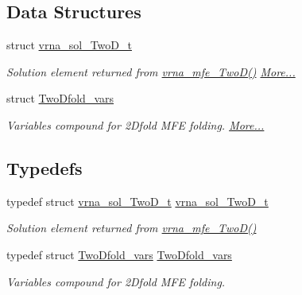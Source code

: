 \subsection*{Data Structures}
\begin{DoxyCompactItemize}
\item 
struct \hyperlink{group__kl__neighborhood__mfe_structvrna__sol__TwoD__t}{vrna\+\_\+sol\+\_\+\+Two\+D\+\_\+t}
\begin{DoxyCompactList}\small\item\em Solution element returned from \hyperlink{group__kl__neighborhood__mfe_ga243c288b463147352829df04de6a2f77}{vrna\+\_\+mfe\+\_\+\+Two\+D()}  \hyperlink{group__kl__neighborhood__mfe_structvrna__sol__TwoD__t}{More...}\end{DoxyCompactList}\item 
struct \hyperlink{group__kl__neighborhood__mfe_structTwoDfold__vars}{Two\+Dfold\+\_\+vars}
\begin{DoxyCompactList}\small\item\em Variables compound for 2\+Dfold M\+FE folding.  \hyperlink{group__kl__neighborhood__mfe_structTwoDfold__vars}{More...}\end{DoxyCompactList}\end{DoxyCompactItemize}
\subsection*{Typedefs}
\begin{DoxyCompactItemize}
\item 
typedef struct \hyperlink{group__kl__neighborhood__mfe_structvrna__sol__TwoD__t}{vrna\+\_\+sol\+\_\+\+Two\+D\+\_\+t} \hyperlink{group__kl__neighborhood__mfe_ga6a81a58268d250309712549a3fa0aab2}{vrna\+\_\+sol\+\_\+\+Two\+D\+\_\+t}
\begin{DoxyCompactList}\small\item\em Solution element returned from \hyperlink{group__kl__neighborhood__mfe_ga243c288b463147352829df04de6a2f77}{vrna\+\_\+mfe\+\_\+\+Two\+D()} \end{DoxyCompactList}\item 
typedef struct \hyperlink{group__kl__neighborhood__mfe_structTwoDfold__vars}{Two\+Dfold\+\_\+vars} \hyperlink{group__kl__neighborhood__mfe_gaf4f514010a14f9d59d850742b3e96954}{Two\+Dfold\+\_\+vars}
\begin{DoxyCompactList}\small\item\em Variables compound for 2\+Dfold M\+FE folding. \end{DoxyCompactList}\end{DoxyCompactItemize}
